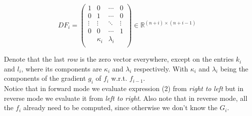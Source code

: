 \documentclass[11pt,a4paper]{article}
\def\R{{\mathbb R}}
\theoremstyle{definition} %
\begin{document}
\[
	DF_i =
	\begin{pmatrix}
		1      & 0        & \cdots    & 0      \\
		0      & 1        & \cdots    & 0      \\
		\vdots & \vdots   & \ddots    & \vdots \\
		0      & 0        & \cdots    & 1      \\
		       & \kappa_i & \lambda_i &        \\
	\end{pmatrix}
	\in
	\R^{(n+i) \times (n+i-1)}
\]

Denote that the last \textit{row} is the zero vector everywhere,
except on the entries $k_i$ and  $l_i$, where its components are
$\kappa_i$ and $\lambda_i$ respectively. With  $\kappa_i$ and
$\lambda_i$ being the components of the gradient $g_i$ of $f_i$
w.r.t. $f_{i-1}$.
\\

Notice that in forward mode we evaluate expression (2) from
\textit{right to left} but in reverse mode we evaluate it from
\textit{left to right}. Also note that in reverse mode,
all the $f_i$ already need to be computed, since otherwise
we don't know the $G_i$.
\end{document}
